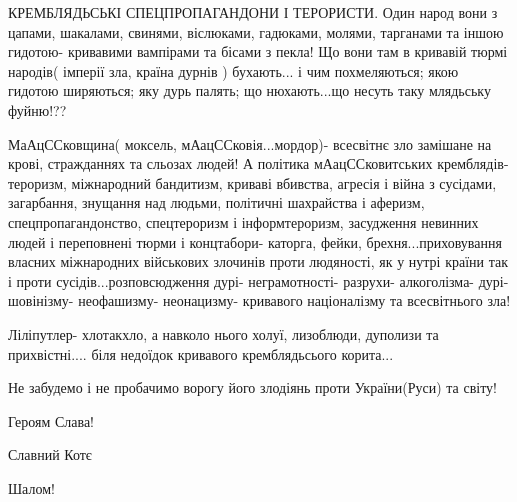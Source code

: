 КРЕМБЛЯДЬСЬКІ СПЕЦПРОПАГАНДОНИ І ТЕРОРИСТИ. Один народ вони з цапами, шакалами,
свинями, віслюками, гадюками, молями, тарганами та іншою гидотою- кривавими
вампірами та бісами з пекла! Що вони там в кривавій тюрмі народів( імперії зла,
країна дурнів ) бухають... і чим похмеляються; якою гидотою ширяються; яку дурь
палять; що нюхають...що несуть таку млядьську фуйню!??

МаАцССковщина( моксель, мАацССковія...мордор)- всесвітнє зло замішане на крові,
стражданнях та сльозах людей! А політика мАацССковитських кремблядів- тероризм,
міжнародний бандитизм, криваві вбивства, агресія і війна з сусідами,
загарбання, знущання над людьми, політичні шахрайства і аферизм,
спецпропагандонство, спецтероризм і інформтероризм, засудження невинних людей і
переповнені тюрми і концтабори- каторга, фейки, брехня...приховування власних
міжнародних військових злочинів проти людяності, як у нутрі країни так і проти
сусідів...розповсюдження дурі- неграмотності- разрухи- алкоголізма- дурі-
шовінізму- неофашизму- неонацизму- кривавого націоналізму та всесвітнього зла!

Ліліпутлер- хлотакхло, а навколо нього холуї, лизоблюди, дуполизи та
прихвістні.... біля недоїдок кривавого кремблядьсього корита...

Не забудемо і не пробачимо ворогу його злодіянь проти України(Руси) та світу!

 
Героям Слава!

 
Славний Котє

 
Шалом!

 

